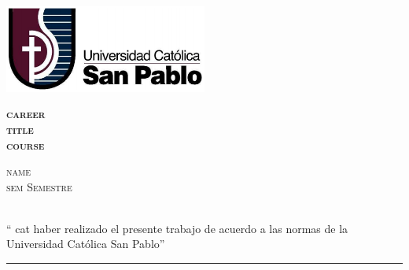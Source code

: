 \documentclass[pdftex,12pt,a4paper]{article}
\begin{document}
\begin{titlepage}

\begin{minipage}[t][0.99\textheight][t]{0.9\textwidth}

  \begin{center}

  \begin{flushright}
    \includegraphics[width=0.5\textwidth]{ucsp.png}\\[1cm]
    \end{flushright}
    \textsc{\Huge\textbf{ {{ career }} } }\\[0.8cm]
    \textsc{\LARGE\textbf{ {{ title }} } }\\[0.8cm]
    \textsc{\huge\textbf{ {{ course }} } }\\[1.8cm]
  \end{center}

  \begin{flushright}
    \begin{minipage}{0.6\textwidth}
    \begin{flushleft}
    \textsc{\Large {{ name }}\\[0.25cm]}
    \textsc{\Large {{ sem }} Semestre}\\[0.2cm]
    \textsc{\Large \the\year}\\
    \end{flushleft}
    \end{minipage}
  \end{flushright}

  \vfill
  \begin{center}
    \begin{minipage}{0.95\textwidth}
      \large{
      ``{{ cat }} haber realizado el presente trabajo de acuerdo
      a las normas de la Universidad Católica San Pablo''}
      \\[1.9cm]
    \end{minipage}

    \begin{minipage}{0.6\textwidth}
      \rule{\textwidth}{0.8pt}
    \end{minipage}
  \end{center}

\end{minipage}

\end{titlepage}
\end{document}
